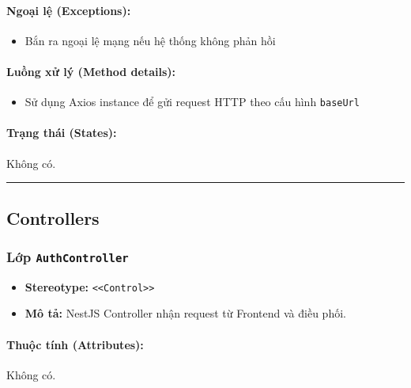 \documentclass[12pt,a4paper]{article}
\begin{document}
\paragraph{Ngoại lệ (Exceptions):}
\begin{itemize}[leftmargin=*]
    \item Bắn ra ngoại lệ mạng nếu hệ thống không phản hồi
\end{itemize}


\paragraph{Luồng xử lý (Method details):}
\begin{itemize}[leftmargin=*]
    \item Sử dụng Axios instance để gửi request HTTP theo cấu hình \texttt{baseUrl}
\end{itemize}


\paragraph{Trạng thái (States):}
Không có.

\vskip 0.5cm
\noindent\rule{\textwidth}{0.5pt}
\vskip 0.5cm

\subsection{Controllers}

\subsubsection{Lớp \texttt{AuthController}}
\begin{itemize}[leftmargin=*]
    \item \textbf{Stereotype:} \texttt{\textless{}\textless{}Control\textgreater{}\textgreater{}}
    \item \textbf{Mô tả:} NestJS Controller nhận request từ Frontend và điều phối.
\end{itemize}

\paragraph{Thuộc tính (Attributes):}
Không có.
\end{document}
